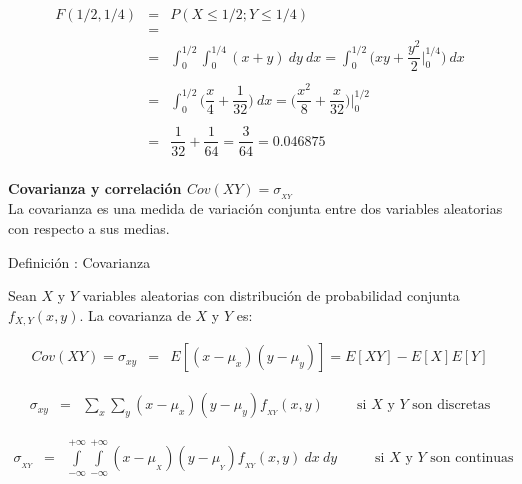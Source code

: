 \documentclass[base=hide,12pt]{elegantbook}
\begin{document}
\begin{eqnarray*}
	F(1/2,1/4)&=& P(X \leq 1/2 ; Y \leq 1/4) \\
	          &=&\\
	          &=& 	\displaystyle\int_{0}^{1/2} \displaystyle\int_{0}^{1/4} (x+y) \:dy \:dx  =
	          \displaystyle\int_{0}^{1/2} \Bigg(xy+\dfrac{y^{2}}{2} \Bigg|_{0}^{1/4} \Bigg)\:dx\\
	          &&\\
	          &=& \displaystyle\int_{0}^{1/2} \Bigg(\dfrac{x}{4}+\dfrac{1}{32} \Bigg)\:dx =
	              \Bigg( \dfrac{x^{2}}{8}+\dfrac{x}{32} \Bigg) \Bigg|_{0}^{1/2}\\
	          &&\\
	          &=& \dfrac{1}{32}+\dfrac{1}{64} = \dfrac{3}{64} =  0.046875\\
\end{eqnarray*}

\vspace{1cm}
\vspace{1cm}
\textcolor{col4}{\bf \large Covarianza y correlación $Cov(XY)=\sigma_{_{XY}}$}\\

La  covarianza es una  medida de variación  conjunta entre  dos  variables  aleatorias con respecto a sus medias.

\begin{Box4}{Definición : Covarianza} 
	
Sean $X$ y $Y$ variables aleatorias con distribución de probabilidad conjunta $f_{X,Y}(x,y)$. La covarianza de $X$ y $Y$ es:

\begin{eqnarray*}
	Cov(XY)=\sigma_{xy}&=&E\left[(x-\mu_{x})(y-\mu_{y})\right] = E[XY]-E[X] E[Y]
\end{eqnarray*}



\begin{eqnarray*}
	\sigma_{xy}&=&\sum\limits_{x}^{}\sum\limits_{y}^{}(x-\mu_{x})(y-\mu_{y})f_{_{XY}}(x,y) \hspace{1cm} \text{si $X$ y $Y$ son discretas}
\end{eqnarray*}

\begin{eqnarray*}
	\sigma_{_{XY}}&=&\int\limits_{-\infty}^{+\infty}\int\limits_{-\infty}^{+\infty}(x-\mu_{_{X}})(y-\mu_{_{Y}})f_{_{XY}}(x,y)\:dx\:dy \hspace{1cm} \text{ si $X$ y $Y$ son continuas}
\end{eqnarray*}
\end{Box4}
\vspace{.5cm}
\end{document}
